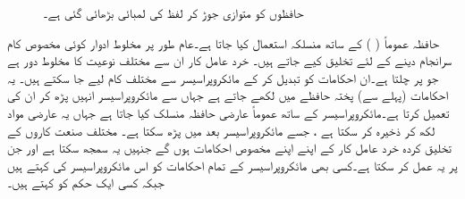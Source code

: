 \begin{figure}
\begin{subfigure}{0.55\textwidth}
\end{subfigure}\hfill
\begin{subfigure}{0.35\textwidth}
\centering
{}
\caption{}
\end{subfigure}
\caption{حافظوں کو متوازی جوڑ کر لفظ کی لمبائی بڑھائی گئی ہے۔}
\label{شکل_حافظہ_متوازی_جوڑنا}
\end{figure}

حافظہ عموماً  ( ) کے ساتھ منسلکہ استعمال کیا جاتا ہے۔عام طور پر مخلوط ادوار کوئی مخصوص کام سرانجام دینے کے لئے تخلیق کیے جاتے ہیں۔ خرد عامل کار ان سے مختلف نوعیت کا مخلوط دور ہے جو  پر چلتا ہے۔ان احکامات کو تبدیل کر کے مائکروپراسیسر سے مختلف کام لیے جا سکتے ہیں۔ یہ احکامات (پہلے سے) پختہ حافظے میں لکھے جاتے ہے جہاں سے مائکروپراسیسر انہیں پڑھ کر ان کی تعمیل کرتا ہے۔مائکروپراسیسر کے ساتھ عموماً عارضی حافظہ منسلک کیا جاتا ہے جہاں یہ عارضی مواد لکھ کر ذخیرہ کر سکتا ہے  ، جسے  مائکروپراسیسر بعد میں  پڑھ سکتا ہے۔ مختلف صنعت کاروں کے تخلیق کردہ خرد عامل کار کے اپنے اپنے مخصوص احکامات ہوں گے جنہیں یہ سمجھ سکتا ہے اور جن پر یہ عمل کر سکتا ہے۔کسی بھی مائکروپراسیسر کے تمام احکامات کو اس مائکروپراسیسر کی  کہتے ہیں جبکہ کسی ایک حکم کو کہتے ہیں۔

